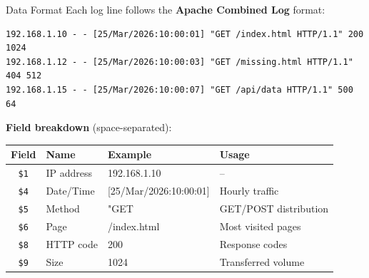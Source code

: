 \documentclass[aspectratio=169, 11pt]{beamer}
\begin{document}
\begin{frame}[fragile]{Data Format}
  Each log line follows the \textbf{Apache Combined Log} format:

  \vspace{0.3em}
  \begin{lstlisting}[basicstyle=\ttfamily\tiny]
192.168.1.10 - - [25/Mar/2026:10:00:01] "GET /index.html HTTP/1.1" 200 1024
192.168.1.12 - - [25/Mar/2026:10:00:03] "GET /missing.html HTTP/1.1" 404 512
192.168.1.15 - - [25/Mar/2026:10:00:07] "GET /api/data HTTP/1.1" 500 64
  \end{lstlisting}

  \vspace{0.5em}
  \textbf{Field breakdown} (space-separated):

  \vspace{0.3em}
  \centering
  \begin{tabular}{clll}
    \toprule
    \textbf{Field} & \textbf{Name} & \textbf{Example} & \textbf{Usage} \\
    \midrule
    \texttt{\$1} & IP address & 192.168.1.10 & -- \\
    \texttt{\$4} & Date/Time & [25/Mar/2026:10:00:01] & Hourly traffic \\
    \texttt{\$5} & Method & "GET & GET/POST distribution \\
    \texttt{\$6} & Page & /index.html & Most visited pages \\
    \texttt{\$8} & HTTP code & 200 & Response codes \\
    \texttt{\$9} & Size & 1024 & Transferred volume \\
    \bottomrule
  \end{tabular}
\end{frame}
\end{document}
